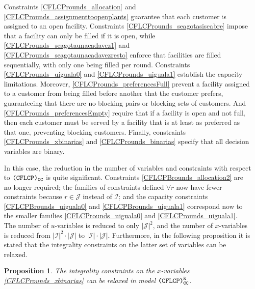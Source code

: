 \documentclass[preprint,11pt,authoryear]{elsarticle}
\def\J{\mathcal{J}}
\def\I{\mathcal{I}}
\newtheorem{prop}[theorem]{Proposition}
\begin{document}
Constraints \eqref{CFLCProunds_allocation} and \eqref{CFLCProunds_assignmenttoopenplants} guarantee that each customer is assigned to an open facility. Constraints \eqref{CFLCProunds_seagotasiseabre} impose that a facility can only be filled if it is open, while \eqref{CFLCProunds_seagotaunacadavez1} and \eqref{CFLCProunds_seagotaunacadavezresto} enforce that facilities are filled sequentially, with only one being filled per round. Constraints \eqref{CFLCProunds_uiguala0} and \eqref{CFLCProunds_uiguala1} establish the capacity limitations. Moreover, \eqref{CFLCProunds_preferencesFull} prevent a facility assigned to a customer from being filled before another that the customer prefers, guaranteeing that there are no blocking pairs or blocking sets of customers. And \eqref{CFLCProunds_preferencesEmpty} require that if a facility is open and not full, then each customer must be served by a facility that is at least as preferred as that one, preventing blocking customers. Finally, constraints \eqref{CFLCProunds_xbinarias} and \eqref{CFLCProunds_binarias} specify that all decision variables are binary.

In this case, the reduction in the number of variables and constraints with respect to ${\normalfont \texttt{(CFLCP)}_{\texttt{CC}}}$ is quite significant. Constraints \eqref{CFLCPBrounds_allocation2} are no longer required; the families of constraints defined $\forall r$ now have fewer constraints because $r\in \J$ instead of $\I$; and the capacity constraints \eqref{CFLCPBrounds_uiguala0} and \eqref{CFLCPBrounds_uiguala1} correspond now to the smaller families \eqref{CFLCProunds_uiguala0} and \eqref{CFLCProunds_uiguala1}. The number of $u$-variables is reduced to only $|\J|^2$, and the number of $x$-variables is reduced from $|\I|^2 \cdot |\J|$ to $|\I| \cdot |\J|$. Furthermore, in the following proposition it is stated that the integrality constraints on the latter set of variables can be relaxed.


\begin{prop}
    The integrality constraints on the $x$-variables \eqref{CFLCProunds_xbinarias} can be relaxed in model ${\normalfont \texttt{(CFLCP)}_{\texttt{CC}}^\texttt{R}}$.
\end{prop}
\end{document}

